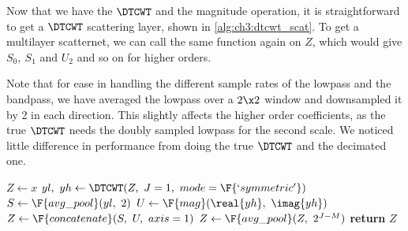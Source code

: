 Now that we have the $\DTCWT$ and the magnitude operation, it is straightforward
to get a $\DTCWT$ scattering layer, shown in \autoref{alg:ch3:dtcwt_scat}. To
get a multilayer scatternet, we can call the same function again on $Z$, which
would give $S_0,\ S_1$ and $U_2$ and so on for higher orders. 

Note that for ease in handling the different sample rates of the lowpass and the
bandpass, we have averaged the lowpass over a $2\x 2$ window and downsampled it
by 2 in each direction. This slightly
affects the higher order coefficients, as the true $\DTCWT$ needs the doubly
sampled lowpass for the second scale. We noticed little difference in
performance from doing the true $\DTCWT$ and the decimated one.

\begin{algorithm}[tb]
  \label{alg:ch3:dtcwt_scat}
\begin{algorithmic}[1]
\State $Z \gets x$
  \State $yl,\ yh \gets \DTCWT(Z,\ J=1,\ mode=\F{`symmetric'})$
  \State $S \gets \F{avg\_pool}(yl,\ 2)$
  \State $U \gets \F{mag}(\real{yh},\ \imag{yh})$ 
  \State $Z \gets \F{concatenate}(S,\ U,\ axis=1)$ 
\EndFor
{}
\State $Z \gets \F{avg\_pool}(Z,\ 2^{J-M})$
\EndIf
\State \textbf{return} $Z$
\EndFunction
\end{algorithmic}
\end{algorithm}
